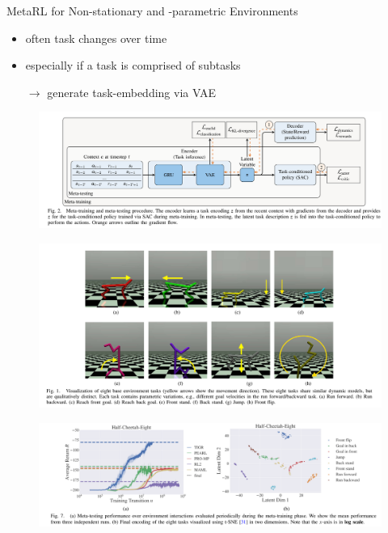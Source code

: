 \documentclass[12pt]{beamer}
\begin{document}
\begin{frame}{MetaRL for Non-stationary and -parametric Environments \parencite{paper}}
  \begin{itemize}
    \item often task changes over time
    \item especially if a task is comprised of subtasks
    \pause
    \item[$\rightarrow$] generate task-embedding via VAE
  \end{itemize}
  \begin{figure}[h]
    \includegraphics[width=\textwidth]{./diagram.png}
  \end{figure}
\end{frame}

\begin{frame}
  \begin{figure}
    \includegraphics[height=0.5\textheight]{./half-cheetah-eight.png}
  \end{figure}
  \begin{figure}
    \includegraphics[height=0.5\textheight, width=\textwidth, keepaspectratio]{./evaluation.png}
  \end{figure}
\end{frame}
\end{document}
